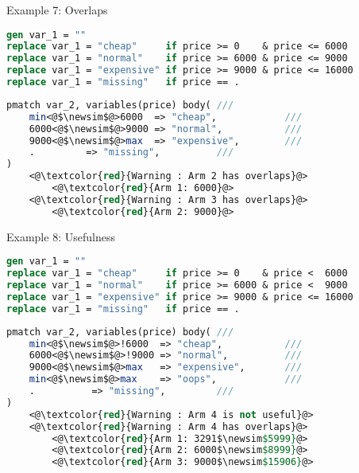\documentclass[11pt]{beamer}
\let\newsim\sim
\renewcommand{\newsim}{\mathrel{\mathpalette\bueckirel\sim}}
\newcommand{\bueckirel}[2]{%
  \raisebox{\depth}{\scalebox{0.808}{$#1#2$}}%
}
\begin{document}
\begin{frame}[fragile]{Example 7: Overlaps}
\label{example_7}

\footnotesize
\begin{lstlisting}[language=Stata]
gen var_1 = ""
replace var_1 = "cheap"     if price >= 0    & price <= 6000
replace var_1 = "normal"    if price >= 6000 & price <= 9000
replace var_1 = "expensive" if price >= 9000 & price <= 16000
replace var_1 = "missing"   if price == .
\end{lstlisting}

\begin{lstlisting}[language=Stata]
pmatch var_2, variables(price) body( ///
    min<@$\newsim$@>6000  => "cheap",            ///
    6000<@$\newsim$@>9000 => "normal",           ///
    9000<@$\newsim$@>max  => "expensive",        ///
    .         => "missing",          ///
)
    <@\textcolor{red}{Warning : Arm 2 has overlaps}@>
        <@\textcolor{red}{Arm 1: 6000}@>
    <@\textcolor{red}{Warning : Arm 3 has overlaps}@>
        <@\textcolor{red}{Arm 2: 9000}@>
\end{lstlisting}

\end{frame}

\begin{frame}[fragile]{Example 8: Usefulness}
\label{example_8}

\footnotesize
\begin{lstlisting}[language=Stata]
gen var_1 = ""
replace var_1 = "cheap"     if price >= 0    & price <  6000
replace var_1 = "normal"    if price >= 6000 & price <  9000
replace var_1 = "expensive" if price >= 9000 & price <= 16000
replace var_1 = "missing"   if price == .
\end{lstlisting}

\begin{lstlisting}[language=Stata]
pmatch var_2, variables(price) body( ///
    min<@$\newsim$@>!6000  => "cheap",           ///
    6000<@$\newsim$@>!9000 => "normal",          ///
    9000<@$\newsim$@>max   => "expensive",       ///
    min<@$\newsim$@>max    => "oops",            ///
    .          => "missing",         ///
)
    <@\textcolor{red}{Warning : Arm 4 is not useful}@>
    <@\textcolor{red}{Warning : Arm 4 has overlaps}@>
        <@\textcolor{red}{Arm 1: 3291$\newsim$5999}@>
        <@\textcolor{red}{Arm 2: 6000$\newsim$8999}@>
        <@\textcolor{red}{Arm 3: 9000$\newsim$15906}@>
\end{lstlisting}
\end{frame}
\end{document}
